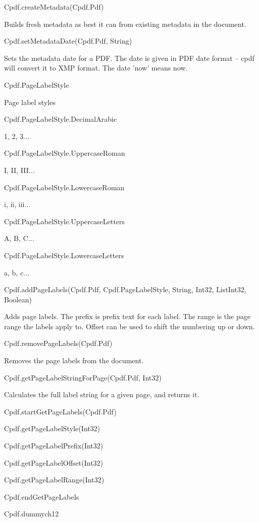 Cpdf.createMetadata(Cpdf.Pdf)

Builds fresh metadata as best it can from
existing metadata in the document.

Cpdf.setMetadataDate(Cpdf.Pdf, String)

Sets the metadata date for a PDF. The date
is given in PDF date format -- cpdf will convert it to XMP format. The
date 'now' means now.

Cpdf.PageLabelStyle

Page label styles

Cpdf.PageLabelStyle.DecimalArabic

1, 2, 3...

Cpdf.PageLabelStyle.UppercaseRoman

I, II, III...

Cpdf.PageLabelStyle.LowercaseRoman

i, ii, iii...

Cpdf.PageLabelStyle.UppercaseLetters

A, B, C...

Cpdf.PageLabelStyle.LowercaseLetters

a, b, c...

Cpdf.addPageLabels(Cpdf.Pdf, Cpdf.PageLabelStyle, String, Int32, List{Int32}, Boolean)

Adds page labels. The prefix is prefix text for each label. The range is the page range the
labels apply to. Offset can be used to shift the numbering up or down.

Cpdf.removePageLabels(Cpdf.Pdf)

Removes the page labels from the document.

Cpdf.getPageLabelStringForPage(Cpdf.Pdf, Int32)

Calculates the full label
string for a given page, and returns it.

Cpdf.startGetPageLabels(Cpdf.Pdf)

Cpdf.getPageLabelStyle(Int32)

Cpdf.getPageLabelPrefix(Int32)

Cpdf.getPageLabelOffset(Int32)

Cpdf.getPageLabelRange(Int32)

Cpdf.endGetPageLabels

Cpdf.dummych12

